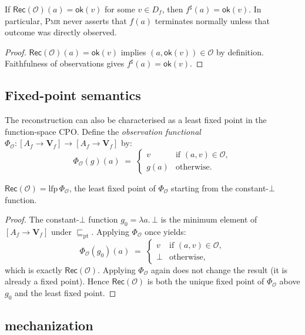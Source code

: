 \documentclass[11pt]{article}
\newcommand{\Apx}{\sqsubseteq}              %
\newcommand{\FixP}{\mathrm{lfp}}           %
\newcommand{\POK}[1]{\mathsf{ok}(#1)}      %
\newcommand{\PMR}{\textsc{Pmr}}            %
\newcommand{\ObsSet}{\mathcal{O}}          %
\newcommand{\RecAlg}{\mathsf{Rec}}         %
\newcommand{\PVal}{\mathbf{V}}             %
\begin{document}
\begin{corollary}\label{cor:no-false-term}
If $\RecAlg(\ObsSet)(a) = \POK{v}$ for some $v \in D_f$, then
$f^\sharp(a) = \POK{v}$.  In particular, \PMR{} never asserts that
$f(a)$ terminates normally unless that outcome was directly observed.
\end{corollary}

\begin{proof}
$\RecAlg(\ObsSet)(a) = \POK{v}$ implies $(a, \POK{v}) \in \ObsSet$
by definition.  Faithfulness of observations gives $f^\sharp(a) =
\POK{v}$.
\end{proof}

\subsection{Fixed-point semantics}

The reconstruction can also be characterised as a least fixed point in
the function-space CPO.  Define the \emph{observation functional}
$\Phi_\ObsSet : [A_f \to \PVal_f] \to [A_f \to \PVal_f]$ by:
\[
  \Phi_\ObsSet(g)(a)
  \;=\;
  \begin{cases}
    v     & \text{if } (a, v) \in \ObsSet, \\
    g(a)  & \text{otherwise.}
  \end{cases}
\]

\begin{proposition}\label{prop:lfp}
$\RecAlg(\ObsSet) = \FixP\,\Phi_\ObsSet$, the least fixed point of
$\Phi_\ObsSet$ starting from the constant-$\bot$ function.
\end{proposition}

\begin{proof}
The constant-$\bot$ function $g_0 = \lambda a.\,\bot$ is the minimum
element of $[A_f \to \PVal_f]$ under $\Apx_\mathrm{pt}$.  Applying
$\Phi_\ObsSet$ once yields:
\[
  \Phi_\ObsSet(g_0)(a)
  \;=\;
  \begin{cases}
    v   & \text{if } (a, v) \in \ObsSet, \\
    \bot & \text{otherwise,}
  \end{cases}
\]
which is exactly $\RecAlg(\ObsSet)$.  Applying $\Phi_\ObsSet$ again
does not change the result (it is already a fixed point).  Hence
$\RecAlg(\ObsSet)$ is both the unique fixed point of $\Phi_\ObsSet$
above $g_0$ and the least fixed point.
\end{proof}

\subsection{\LEAN{} mechanization}
\end{document}
